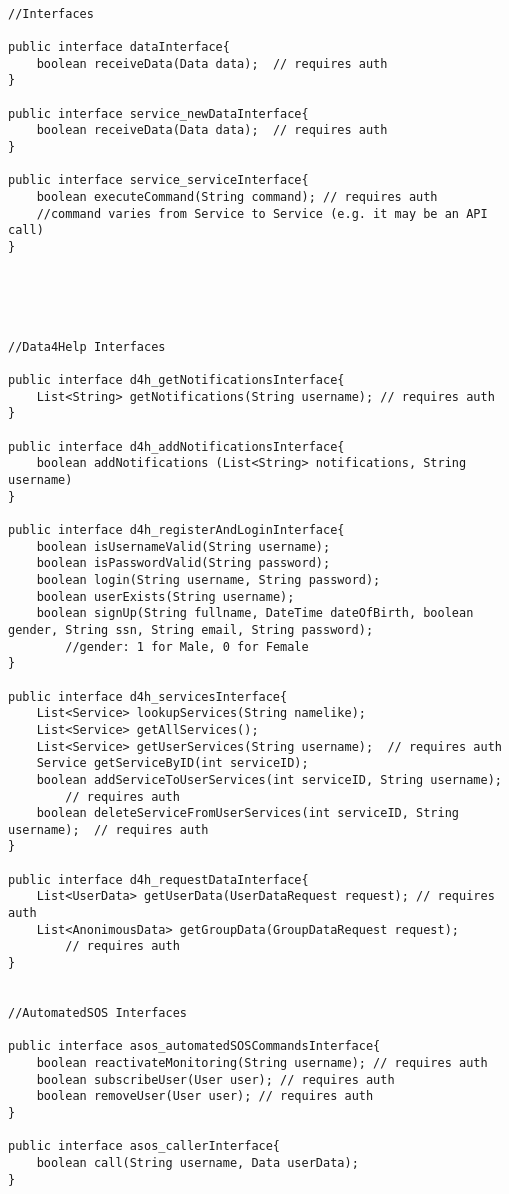 \documentclass[../../DD.tex]{subfiles}
\begin{document}
\begin{lstlisting}

//Interfaces

public interface dataInterface{
	boolean receiveData(Data data);  // requires auth
}

public interface service_newDataInterface{
	boolean receiveData(Data data);  // requires auth
}

public interface service_serviceInterface{
	boolean executeCommand(String command);	// requires auth
	//command varies from Service to Service (e.g. it may be an API call) 
}





//Data4Help Interfaces

public interface d4h_getNotificationsInterface{
	List<String> getNotifications(String username);	// requires auth
}

public interface d4h_addNotificationsInterface{
	boolean addNotifications (List<String> notifications, String username)
}

public interface d4h_registerAndLoginInterface{
	boolean isUsernameValid(String username);
	boolean isPasswordValid(String password);
	boolean login(String username, String password);
	boolean userExists(String username);
	boolean signUp(String fullname, DateTime dateOfBirth, boolean gender, String ssn, String email, String password);
		//gender: 1 for Male, 0 for Female
}

public interface d4h_servicesInterface{
	List<Service> lookupServices(String namelike);
	List<Service> getAllServices();
	List<Service> getUserServices(String username);  // requires auth
	Service getServiceByID(int serviceID);
	boolean addServiceToUserServices(int serviceID, String username);
		// requires auth
	boolean deleteServiceFromUserServices(int serviceID, String username);  // requires auth
}

public interface d4h_requestDataInterface{
	List<UserData> getUserData(UserDataRequest request); // requires auth
	List<AnonimousData> getGroupData(GroupDataRequest request);
		// requires auth
}


//AutomatedSOS Interfaces

public interface asos_automatedSOSCommandsInterface{
	boolean reactivateMonitoring(String username); // requires auth
	boolean subscribeUser(User user); // requires auth
	boolean removeUser(User user); // requires auth
}

public interface asos_callerInterface{
	boolean call(String username, Data userData);
}


\end{lstlisting}
\end{document}
